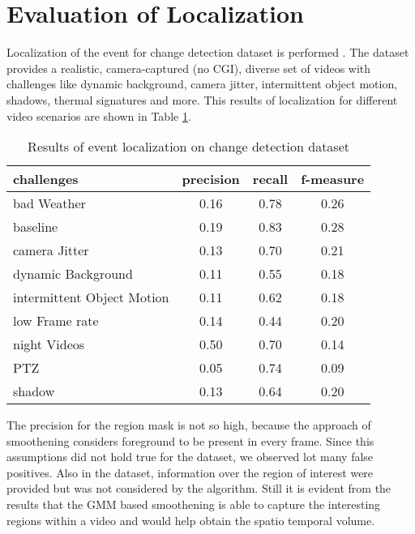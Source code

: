 \section{Evaluation of Localization}
Localization of the event for change detection dataset \citep{cdnet} is performed . The dataset provides  a realistic, camera-captured (no CGI), diverse set of videos with challenges  like dynamic background, camera jitter, intermittent object motion, shadows, thermal signatures and more. This results of localization for different video scenarios are shown in Table \ref{tab:evalLoc}.

\begin{table}[htbp]
   \caption{Results of event localization on change detection dataset}
   \begin{center}
   \begin{tabular}{|l|c|c|c|} \hline
        \textbf{challenges} & \textbf{precision} & \textbf{recall} & \textbf{f-measure} \\ \hline
		bad Weather & 0.16 & 0.78 & 0.26\\
		baseline & 0.19 & 0.83 & 0.28\\
		camera Jitter & 0.13 & 0.70 & 0.21 \\
		dynamic Background & 0.11 & 0.55 &  0.18\\
		intermittent Object Motion & 0.11 & 0.62 & 0.18 \\
		low Frame rate & 0.14 & 0.44 & 0.20 \\
		night Videos & 0.50 & 0.70 & 0.14 \\
		PTZ & 0.05 & 0.74 & 0.09\\
		shadow & 0.13 & 0.64 & 0.20\\ \hline
   \end{tabular}
   \label{tab:evalLoc}
   \end{center}
 \end{table} 
\par The precision for the region mask is not so high, because the approach of smoothening considers foreground to be present in every frame. Since this assumptions did not hold true for the dataset, we observed lot many false positives.  Also in the dataset, information over the region of interest were provided but was not considered by the algorithm. Still it is evident from the results that the GMM based smoothening is able to capture the interesting regions within a video and would help obtain the spatio temporal volume.

